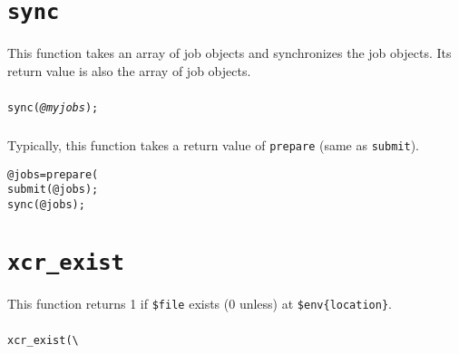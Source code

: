 \documentclass[a4paper,10pt]{report}
\def\|{\verb|} %|
\begin{document}
\section{\texttt{sync}}

This function takes an array of job objects and synchronizes the job objects.
Its return value is also the array of job objects.

\subsubsection{\format}

\begin{boxnote}
\begin{alltt}
sync(\textit{@myjobs});
\end{alltt}
\end{boxnote}
\vspace{\baselineskip}

\subsubsection{\example}

Typically, this function takes a return value of \texttt{prepare}
(same as \texttt{submit}).
\begin{boxnote}
\begin{alltt}
@jobs = prepare(%mytemplate);
submit(@jobs);
sync(@jobs);
\end{alltt}
\end{boxnote}
\vspace{\baselineskip}

\section{\texttt{xcr\_exist}}

This function returns 1 if \texttt{\$file} exists (0 unless) at
\texttt{\$env\{location\}}.

\subsubsection{\format}

\begin{boxnote}
\begin{alltt}
xcr_exist(\|\|%\textit{env}, $file);
\end{alltt}
\end{boxnote}
\vspace{\baselineskip}
\end{document}
